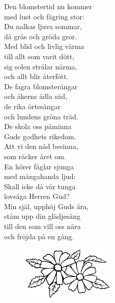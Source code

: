 \documentclass[a6paper,10pt]{article}
\begin{document}
\setlength{\oddsidemargin}{-0.37in}
\noindent
\begin{center}
\end{center}
\begin{lyrics}
Den blomstertid nu kommer\\
med lust och fägring stor:\\
Du nalkas ljuva sommar,\\
då gräs och gröda gror.\\
Med blid och livlig värma\\
till allt som varit dött,\\
sig solen strålar närma,\\
och allt blir återfött.
\vspace{5pt}\\
De fagra blomsterängar\\
och åkerns ädla säd,\\
de rika örtesängar\\
och lundens gröna träd.\\
De skola oss påminna\\
Guds godhets rikedom.\\
Att vi den nåd besinna,\\
som räcker året om.
\vspace{5pt}\\
En hörer fåglar sjunga\\
med mångahanda ljud:\\
Skall icke då vår tunga\\
lovsäga Herren Gud?\\
Min själ, upphöj Guds ära,\\
stäm upp din glädjesång\\
till den som vill oss nära\\
och fröjda på en gång.
\end{lyrics} 
\vspace{-10pt}
\begin{figure}[!h]
\hspace{30pt}\includegraphics[width=0.4\textwidth]{blommor.png}
\end{figure}
\end{document}
